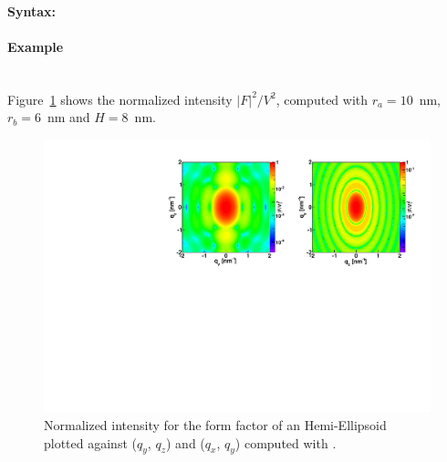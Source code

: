 \paragraph{Syntax:} 

\newpage

\paragraph{Example} \mbox{}\\
Figure~\ref{fig:FFhemiellipsEx} shows the normalized intensity
$|F|^2/V^2$, computed with $r_a=10$~nm, $r_b=6$~nm and $H=8$~nm.

\begin{figure}[ht]
\begin{center}
\includegraphics[angle=-90,width=\textwidth]{Figures/ff/figffhemiellips.pdf}
\end{center}
\caption{Normalized intensity for the form factor of an Hemi-Ellipsoid plotted against ($q_y$, $q_z$) and  ($q_x$, $q_y$)
  computed with .}
\label{fig:FFhemiellipsEx}
\end{figure}



